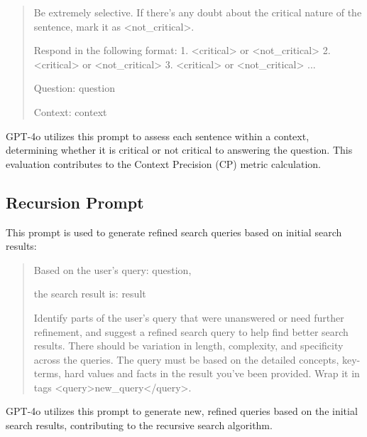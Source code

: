 \documentclass{article}
\begin{document}
\begin{multicols}{2}
\begin{quote}
Be extremely selective. If there's any doubt about the critical nature of the sentence, mark it as \textless not\_critical\textgreater{}.

Respond in the following format:
1. \textless critical\textgreater{} or \textless not\_critical\textgreater{}
2. \textless critical\textgreater{} or \textless not\_critical\textgreater{}
3. \textless critical\textgreater{} or \textless not\_critical\textgreater{}
...

Question: {question}

Context:
{context}
\end{quote}

GPT-4o utilizes this prompt to assess each sentence within a context, determining whether it is critical or not critical to answering the question. This evaluation contributes to the Context Precision (CP) metric calculation.

\subsection{Recursion Prompt}
\label{sec:recursion_prompt}
This prompt is used to generate refined search queries based on initial search results:

\begin{quote}
Based on the user's query: {question}, 

the search result is: 
    {result}

Identify parts of the user's query that were unanswered or need further refinement, and suggest a refined search query to help find better search results. 
There should be variation in length, complexity, and specificity across the queries. 
The query must be based on the detailed concepts, key-terms, hard values and facts in the result you've been provided.
Wrap it in tags \textless query\textgreater{}new\_query\textless /query\textgreater{}.

\end{quote}

GPT-4o utilizes this prompt to generate new, refined queries based on the initial search results, contributing to the recursive search algorithm.

\end{multicols}
\end{document}
